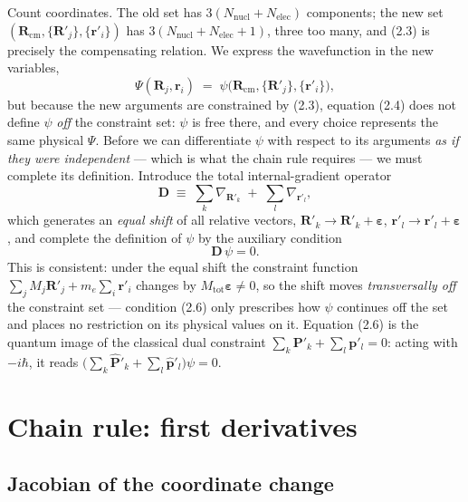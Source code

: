 \documentclass{article}
\begin{document}
Count coordinates. The old set has $3(N_{\mathrm{nucl}}+N_{\mathrm{elec}})$ components; the new set $(\mathbf{R}_{\mathrm{cm}},\{\mathbf{R}'_j\},\{\mathbf{r}'_i\})$ has $3(N_{\mathrm{nucl}}+N_{\mathrm{elec}}+1)$, three too many, and (2.3) is precisely the compensating relation. We express the wavefunction in the new variables,
\begin{equation}
\Psi(\mathbf{R}_j,\mathbf{r}_i)\;=\;\psi\bigl(\mathbf{R}_{\mathrm{cm}},\{\mathbf{R}'_j\},\{\mathbf{r}'_i\}\bigr), \tag{2.4}
\end{equation}
but because the new arguments are constrained by (2.3), equation (2.4) does not define $\psi$ \emph{off} the constraint set: $\psi$ is free there, and every choice represents the same physical $\Psi$. Before we can differentiate $\psi$ with respect to its arguments \emph{as if they were independent} --- which is what the chain rule requires --- we must complete its definition. Introduce the total internal-gradient operator
\begin{equation}
\mathbf{D}\;\equiv\;\sum_k\nabla_{\mathbf{R}'_k}\;+\;\sum_l\nabla_{\mathbf{r}'_l}, \tag{2.5}
\end{equation}
which generates an \emph{equal shift} of all relative vectors, $\mathbf{R}'_k\to\mathbf{R}'_k+\boldsymbol{\varepsilon}$, $\mathbf{r}'_l\to\mathbf{r}'_l+\boldsymbol{\varepsilon}$, and complete the definition of $\psi$ by the auxiliary condition
\begin{equation}
\boxed{\;\mathbf{D}\,\psi=0.\;} \tag{2.6}
\end{equation}
This is consistent: under the equal shift the constraint function $\sum_j M_j\mathbf{R}'_j+m_e\sum_i\mathbf{r}'_i$ changes by $M_{\mathrm{tot}}\boldsymbol{\varepsilon}\neq0$, so the shift moves \emph{transversally off} the constraint set --- condition (2.6) only prescribes how $\psi$ continues off the set and places no restriction on its physical values on it. Equation (2.6) is the quantum image of the classical dual constraint $\sum_k\mathbf{P}'_k+\sum_l\mathbf{p}'_l=0$: acting with $-i\hbar$, it reads $\bigl(\sum_k\hat{\mathbf{P}}'_k+\sum_l\hat{\mathbf{p}}'_l\bigr)\psi=0$.

\section{Chain rule: first derivatives}

\subsection{Jacobian of the coordinate change}
\end{document}
